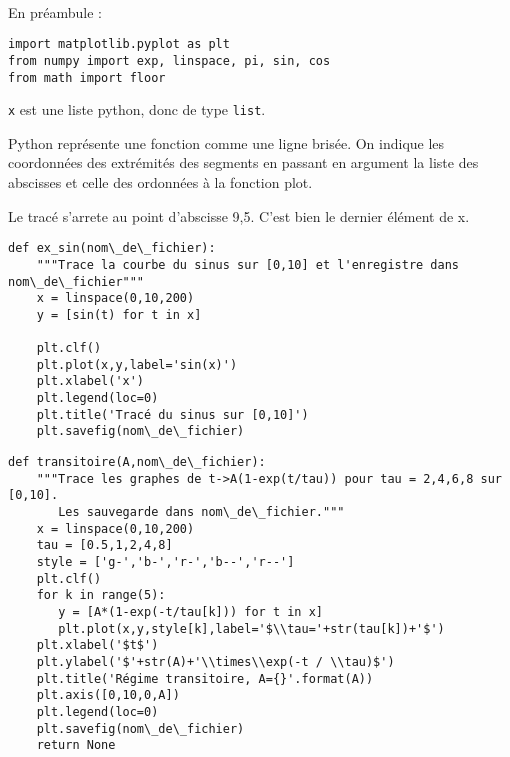 \exer{[PLT-004]}
\setcounter{numques}{0}~\\

En préambule : 
\begin{lstlisting}
import matplotlib.pyplot as plt
from numpy import exp, linspace, pi, sin, cos
from math import floor
\end{lstlisting}


\question{}
\texttt x est une liste python, donc de type \texttt{list}.

\question{}
Python représente une fonction comme une ligne brisée. 
On indique les coordonnées des extrémités des segments en passant en argument la liste des abscisses et celle des ordonnées à la fonction plot.

\question{}
Le tracé s'arrete au point d'abscisse 9,5. C'est bien le dernier élément de x.

\question{}
\begin{lstlisting}
def ex_sin(nom\_de\_fichier):
    """Trace la courbe du sinus sur [0,10] et l'enregistre dans nom\_de\_fichier"""
    x = linspace(0,10,200)
    y = [sin(t) for t in x]

    plt.clf()
    plt.plot(x,y,label='sin(x)')
    plt.xlabel('x')
    plt.legend(loc=0)
    plt.title('Tracé du sinus sur [0,10]')
    plt.savefig(nom\_de\_fichier)
\end{lstlisting}
\question{}
\begin{lstlisting}
def transitoire(A,nom\_de\_fichier):
    """Trace les graphes de t->A(1-exp(t/tau)) pour tau = 2,4,6,8 sur [0,10].
       Les sauvegarde dans nom\_de\_fichier."""
    x = linspace(0,10,200)
    tau = [0.5,1,2,4,8]
    style = ['g-','b-','r-','b--','r--']
    plt.clf()
    for k in range(5):
       y = [A*(1-exp(-t/tau[k])) for t in x]
       plt.plot(x,y,style[k],label='$\\tau='+str(tau[k])+'$') 
    plt.xlabel('$t$')
    plt.ylabel('$'+str(A)+'\\times\\exp(-t / \\tau)$')
    plt.title('Régime transitoire, A={}'.format(A))
    plt.axis([0,10,0,A])
    plt.legend(loc=0)
    plt.savefig(nom\_de\_fichier)
    return None
\end{lstlisting}